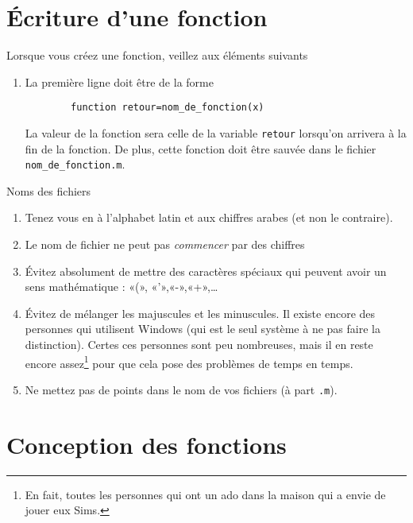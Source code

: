 \section{Écriture d'une fonction}

Lorsque vous créez une fonction, veillez aux éléments suivants 
\begin{enumerate}

	\item
		La première ligne doit être de la forme
		\begin{verbatim}
		function retour=nom_de_fonction(x)
		\end{verbatim}
		La valeur de la fonction sera celle de la variable \verb+retour+ lorsqu'on arrivera à la fin de la fonction. De plus, cette fonction doit être sauvée dans le fichier \verb+nom_de_fonction.m+.

\end{enumerate}

Noms des fichiers
\begin{enumerate}
	\item
		Tenez vous en à l'alphabet latin et aux chiffres arabes (et non le contraire).
	\item
		Le nom de fichier ne peut pas \emph{commencer} par des chiffres
	\item
		Évitez absolument de mettre des caractères spéciaux qui peuvent avoir un sens mathématique : «(», «'»,«-»,«+»,\ldots
	\item
		Évitez de mélanger les majuscules et les minuscules. Il existe encore des personnes qui utilisent Windows (qui est le seul système à ne pas faire la distinction). Certes ces personnes sont peu nombreuses, mais il en reste encore assez\footnote{En fait, toutes les personnes qui ont un ado dans la maison qui a envie de jouer eux Sims.} pour que cela pose des problèmes de temps en temps.
	\item
		Ne mettez pas de points dans le nom de vos fichiers (à part \verb+.m+).
\end{enumerate}

\section{Conception des fonctions}


